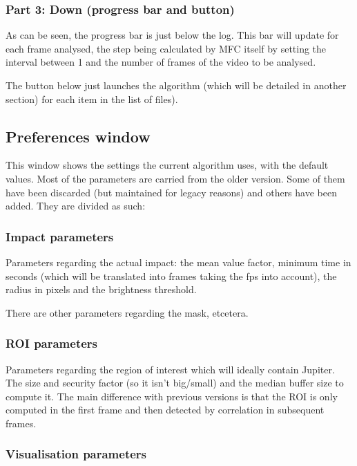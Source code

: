 \documentclass[a4paper,11pt]{memoir}
\begin{document}
\subsubsection{Part 3: Down (progress bar and button)}

As can be seen, the progress bar is just below the log. This bar will update for each frame analysed, the step being calculated by MFC itself by setting the  interval between 1 and the number of frames of the video to be analysed.

The button below just launches the algorithm (which will be detailed in another section) for each item in the list of files).

\subsection{Preferences window}
This window shows the settings the current algorithm uses, with the default values. Most of the parameters are carried from the older version. Some of them have been discarded (but maintained for legacy reasons) and others have been added. They are divided as such:

\subsubsection{Impact parameters}
Parameters regarding the actual impact: the mean value factor, minimum time in seconds (which will be translated into frames taking the fps into account), the radius in pixels and the brightness threshold.

There are other parameters regarding the mask, etcetera.

\subsubsection{ROI parameters}
Parameters regarding the region of interest which will ideally contain Jupiter. The size and security factor (so it isn’t big/small) and the median buffer size to compute it. The main difference with previous versions is that the ROI is only computed in the first frame and then detected by correlation in subsequent frames.

\subsubsection{Visualisation parameters}
\end{document}
